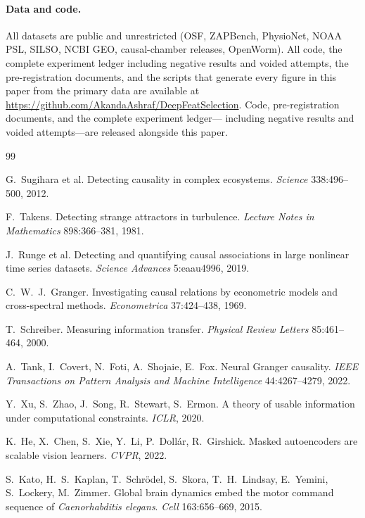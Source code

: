 \documentclass[11pt]{article}
\begin{document}
\paragraph{Data and code.} All datasets are public and unrestricted (OSF, ZAPBench, PhysioNet, NOAA
PSL, SILSO, NCBI GEO, causal-chamber releases, OpenWorm). All code, the
complete experiment ledger including negative results and voided attempts,
the pre-registration documents, and the scripts that generate every figure
in this paper from the primary data are available at
\url{https://github.com/AkandaAshraf/DeepFeatSelection}.
Code, pre-registration documents, and the complete experiment ledger---
including negative results and voided attempts---are released alongside
this paper.


\begin{thebibliography}{99}

 G.~Sugihara et al.
Detecting causality in complex ecosystems. \emph{Science} 338:496--500, 2012.

 F.~Takens.
Detecting strange attractors in turbulence.
\emph{Lecture Notes in Mathematics} 898:366--381, 1981.

 J.~Runge et al.
Detecting and quantifying causal associations in large nonlinear time
series datasets. \emph{Science Advances} 5:eaau4996, 2019.

 C.~W.~J.~Granger.
Investigating causal relations by econometric models and cross-spectral
methods. \emph{Econometrica} 37:424--438, 1969.

 T.~Schreiber.
Measuring information transfer. \emph{Physical Review Letters}
85:461--464, 2000.

 A.~Tank, I.~Covert, N.~Foti, A.~Shojaie, E.~Fox.
Neural Granger causality. \emph{IEEE Transactions on Pattern Analysis and
Machine Intelligence} 44:4267--4279, 2022.

 Y.~Xu, S.~Zhao, J.~Song, R.~Stewart, S.~Ermon.
A theory of usable information under computational constraints.
\emph{ICLR}, 2020.

 K.~He, X.~Chen, S.~Xie, Y.~Li, P.~Doll\'ar,
R.~Girshick. Masked autoencoders are scalable vision learners.
\emph{CVPR}, 2022.

 S.~Kato, H.~S.~Kaplan, T.~Schr\"odel, S.~Skora,
T.~H.~Lindsay, E.~Yemini, S.~Lockery, M.~Zimmer.
Global brain dynamics embed the motor command sequence of
\emph{Caenorhabditis elegans}. \emph{Cell} 163:656--669, 2015.


\end{thebibliography}
\end{document}
